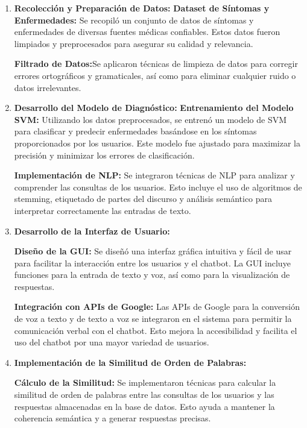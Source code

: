 \begin{enumerate}
	
	\item \textbf{Recolección y Preparación de Datos:}
		\subitem \textbf{Dataset de Síntomas y Enfermedades:} Se recopiló un conjunto de datos de síntomas y enfermedades de diversas fuentes médicas confiables. Estos datos fueron limpiados y preprocesados para asegurar su calidad y relevancia.
		
		\subitem \textbf{Filtrado de Datos:}Se aplicaron técnicas de limpieza de datos para corregir errores ortográficos y gramaticales, así como para eliminar cualquier ruido o datos irrelevantes.
	
	\item \textbf{Desarrollo del Modelo de Diagnóstico:}
		\subitem \textbf{Entrenamiento del Modelo SVM:} Utilizando los datos preprocesados, se entrenó un modelo de SVM para clasificar y predecir enfermedades basándose en los síntomas proporcionados por los usuarios. Este modelo fue ajustado para maximizar la precisión y minimizar los errores de clasificación.
		
		\subitem \textbf{Implementación de NLP:} Se integraron técnicas de NLP para analizar y comprender las consultas de los usuarios. Esto incluye el uso de algoritmos de stemming, etiquetado de partes del discurso y análisis semántico para interpretar correctamente las entradas de texto.
	
	\item \textbf{Desarrollo de la Interfaz de Usuario:}
	
		\subitem \textbf{Diseño de la GUI:} Se diseñó una interfaz gráfica intuitiva y fácil de usar para facilitar la interacción entre los usuarios y el chatbot. La GUI incluye funciones para la entrada de texto y voz, así como para la visualización de respuestas.
		
		\subitem \textbf{Integración con APIs de Google:} Las APIs de Google para la conversión de voz a texto y de texto a voz se integraron en el sistema para permitir la comunicación verbal con el chatbot. Esto mejora la accesibilidad y facilita el uso del chatbot por una mayor variedad de usuarios.
	
	
	\item \textbf{Implementación de la Similitud de Orden de Palabras:}
	
		\subitem \textbf{Cálculo de la Similitud:} Se implementaron técnicas para calcular la similitud de orden de palabras entre las consultas de los usuarios y las respuestas almacenadas en la base de datos. Esto ayuda a mantener la coherencia semántica y a generar respuestas precisas.
	

\end{enumerate}
